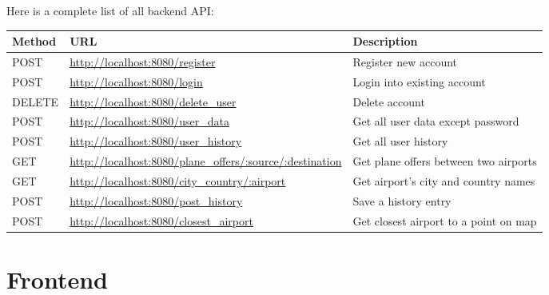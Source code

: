 \documentclass[12pt]{article}
\begin{document}
Here is a complete list of all backend API:
\begin{center}
\begin{tabular}{p{1.5cm}|p{7cm}|p{7cm}}
Method & URL & Description\\[0pt]
\hline
POST & \url{http://localhost:8080/register} & Register new account\\[0pt]
\hline
POST & \url{http://localhost:8080/login} & Login into existing account\\[0pt]
\hline
DELETE & \url{http://localhost:8080/delete\_user} & Delete account\\[0pt]
\hline
POST & \url{http://localhost:8080/user\_data} & Get all user data except password\\[0pt]
\hline
POST & \url{http://localhost:8080/user\_history} & Get all user history\\[0pt]
\hline
GET & \url{http://localhost:8080/plane\_offers/:source/:destination} & Get plane offers between two airports\\[0pt]
\hline
GET & \url{http://localhost:8080/city\_country/:airport} & Get airport's city and country names\\[0pt]
\hline
POST & \url{http://localhost:8080/post\_history} & Save a history entry\\[0pt]
\hline
POST & \url{http://localhost:8080/closest\_airport} & Get closest airport to a point on map\\[0pt]
\end{tabular}
\end{center}

\section{Frontend}
\label{sec:orgb9e37d3}
\end{document}
